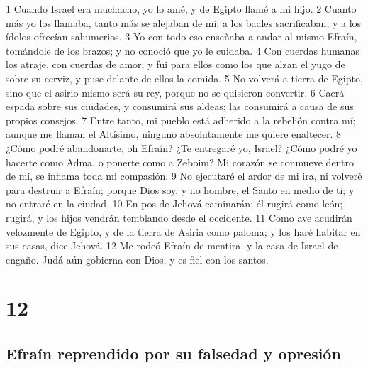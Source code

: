 1 Cuando Israel era muchacho, yo lo amé, y de Egipto llamé a mi hijo. 
2 Cuanto más yo los llamaba, tanto más se alejaban de mí; a los baales sacrificaban, y a los ídolos ofrecían sahumerios.
3 Yo con todo eso enseñaba a andar al mismo Efraín, tomándole de los brazos; y no conoció que yo le cuidaba.
4 Con cuerdas humanas los atraje, con cuerdas de amor; y fui para ellos como los que alzan el yugo de sobre su cerviz, y puse delante de ellos la comida.
5 No volverá a tierra de Egipto, sino que el asirio mismo será su rey, porque no se quisieron convertir.
6 Caerá espada sobre sus ciudades, y consumirá sus aldeas; las consumirá a causa de sus propios consejos. 
7 Entre tanto, mi pueblo está adherido a la rebelión contra mí; aunque me llaman el Altísimo, ninguno absolutamente me quiere enaltecer.
8 ¿Cómo podré abandonarte, oh Efraín? ¿Te entregaré yo, Israel? ¿Cómo podré yo hacerte como Adma, o ponerte como a Zeboim? Mi corazón se conmueve dentro de mí, se inflama toda mi compasión.
9 No ejecutaré el ardor de mi ira, ni volveré para destruir a Efraín; porque Dios soy, y no hombre, el Santo en medio de ti; y no entraré en la ciudad.
10 En pos de Jehová caminarán; él rugirá como león; rugirá, y los hijos vendrán temblando desde el occidente.
11 Como ave acudirán velozmente de Egipto, y de la tierra de Asiria como paloma; y los haré habitar en sus casas, dice Jehová. 
12 Me rodeó Efraín de mentira, y la casa de Israel de engaño. Judá aún gobierna con Dios, y es fiel con los santos.

\chapter{12}

\section*{Efraín reprendido por su falsedad y opresión}

